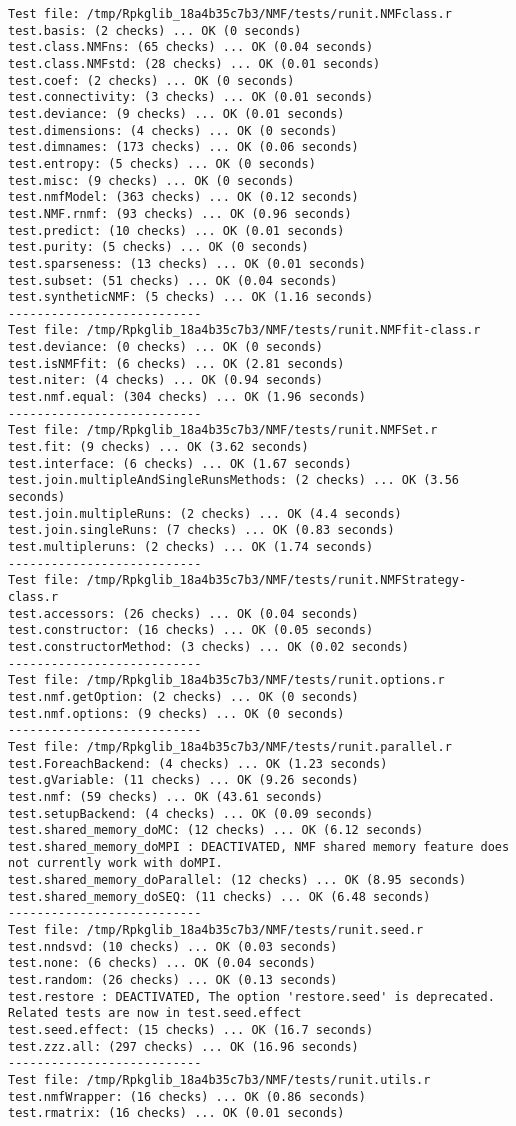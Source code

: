 \documentclass[10pt]{article}\usepackage{graphicx, color}
\begin{document}
\begin{verbatim}
Test file: /tmp/Rpkglib_18a4b35c7b3/NMF/tests/runit.NMFclass.r 
test.basis: (2 checks) ... OK (0 seconds)
test.class.NMFns: (65 checks) ... OK (0.04 seconds)
test.class.NMFstd: (28 checks) ... OK (0.01 seconds)
test.coef: (2 checks) ... OK (0 seconds)
test.connectivity: (3 checks) ... OK (0.01 seconds)
test.deviance: (9 checks) ... OK (0.01 seconds)
test.dimensions: (4 checks) ... OK (0 seconds)
test.dimnames: (173 checks) ... OK (0.06 seconds)
test.entropy: (5 checks) ... OK (0 seconds)
test.misc: (9 checks) ... OK (0 seconds)
test.nmfModel: (363 checks) ... OK (0.12 seconds)
test.NMF.rnmf: (93 checks) ... OK (0.96 seconds)
test.predict: (10 checks) ... OK (0.01 seconds)
test.purity: (5 checks) ... OK (0 seconds)
test.sparseness: (13 checks) ... OK (0.01 seconds)
test.subset: (51 checks) ... OK (0.04 seconds)
test.syntheticNMF: (5 checks) ... OK (1.16 seconds)
--------------------------- 
Test file: /tmp/Rpkglib_18a4b35c7b3/NMF/tests/runit.NMFfit-class.r 
test.deviance: (0 checks) ... OK (0 seconds)
test.isNMFfit: (6 checks) ... OK (2.81 seconds)
test.niter: (4 checks) ... OK (0.94 seconds)
test.nmf.equal: (304 checks) ... OK (1.96 seconds)
--------------------------- 
Test file: /tmp/Rpkglib_18a4b35c7b3/NMF/tests/runit.NMFSet.r 
test.fit: (9 checks) ... OK (3.62 seconds)
test.interface: (6 checks) ... OK (1.67 seconds)
test.join.multipleAndSingleRunsMethods: (2 checks) ... OK (3.56 seconds)
test.join.multipleRuns: (2 checks) ... OK (4.4 seconds)
test.join.singleRuns: (7 checks) ... OK (0.83 seconds)
test.multipleruns: (2 checks) ... OK (1.74 seconds)
--------------------------- 
Test file: /tmp/Rpkglib_18a4b35c7b3/NMF/tests/runit.NMFStrategy-class.r 
test.accessors: (26 checks) ... OK (0.04 seconds)
test.constructor: (16 checks) ... OK (0.05 seconds)
test.constructorMethod: (3 checks) ... OK (0.02 seconds)
--------------------------- 
Test file: /tmp/Rpkglib_18a4b35c7b3/NMF/tests/runit.options.r 
test.nmf.getOption: (2 checks) ... OK (0 seconds)
test.nmf.options: (9 checks) ... OK (0 seconds)
--------------------------- 
Test file: /tmp/Rpkglib_18a4b35c7b3/NMF/tests/runit.parallel.r 
test.ForeachBackend: (4 checks) ... OK (1.23 seconds)
test.gVariable: (11 checks) ... OK (9.26 seconds)
test.nmf: (59 checks) ... OK (43.61 seconds)
test.setupBackend: (4 checks) ... OK (0.09 seconds)
test.shared_memory_doMC: (12 checks) ... OK (6.12 seconds)
test.shared_memory_doMPI : DEACTIVATED, NMF shared memory feature does not currently work with doMPI.
test.shared_memory_doParallel: (12 checks) ... OK (8.95 seconds)
test.shared_memory_doSEQ: (11 checks) ... OK (6.48 seconds)
--------------------------- 
Test file: /tmp/Rpkglib_18a4b35c7b3/NMF/tests/runit.seed.r 
test.nndsvd: (10 checks) ... OK (0.03 seconds)
test.none: (6 checks) ... OK (0.04 seconds)
test.random: (26 checks) ... OK (0.13 seconds)
test.restore : DEACTIVATED, The option 'restore.seed' is deprecated. Related tests are now in test.seed.effect
test.seed.effect: (15 checks) ... OK (16.7 seconds)
test.zzz.all: (297 checks) ... OK (16.96 seconds)
--------------------------- 
Test file: /tmp/Rpkglib_18a4b35c7b3/NMF/tests/runit.utils.r 
test.nmfWrapper: (16 checks) ... OK (0.86 seconds)
test.rmatrix: (16 checks) ... OK (0.01 seconds)


\end{verbatim}
\end{document}
